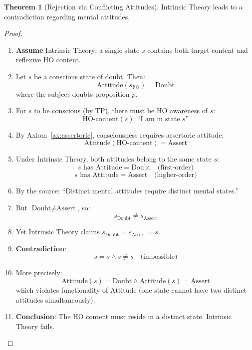 \documentclass[11pt,a4paper]{article}
\theoremstyle{definition}
\newtheorem{theorem}{Theorem}[section]
\theoremstyle{remark}
\newcommand{\Attitude}{\text{Attitude}}
\begin{document}
\begin{theorem}[Rejection via Conflicting Attitudes]
\label{thm:reject-intrinsic}
Intrinsic Theory leads to a contradiction regarding mental attitudes.
\end{theorem}

\begin{proof}
\begin{enumerate}
    \item \textbf{Assume} Intrinsic Theory: a single state $s$ contains both target content and reflexive HO content.
    \item Let $s$ be a conscious state of doubt. Then:
    \begin{equation}
    \Attitude(s_{\text{FO}}) = \text{Doubt}
    \end{equation}
    where the subject doubts proposition $p$.
    \item For $s$ to be conscious (by TP), there must be HO awareness of $s$:
    \begin{equation}
    \text{HO-content}(s) : \text{``I am in state } s\text{''}
    \end{equation}
    \item By Axiom~\ref{ax:assertoric}, consciousness requires assertoric attitude:
    \begin{equation}
    \Attitude(\text{HO-content}) = \text{Assert}
    \end{equation}
    \item Under Intrinsic Theory, both attitudes belong to the same state $s$:
    \begin{equation}
    s \text{ has } \Attitude = \text{Doubt} \quad \text{(first-order)}
    \end{equation}
    \begin{equation}
    s \text{ has } \Attitude = \text{Assert} \quad \text{(higher-order)}
    \end{equation}
    \item By the source: ``Distinct mental attitudes require distinct mental states.''
    \item But $\text{Doubt} \neq \text{Assert}$, so:
    \begin{equation}
    s_{\text{Doubt}} \neq s_{\text{Assert}}
    \end{equation}
    \item Yet Intrinsic Theory claims $s_{\text{Doubt}} = s_{\text{Assert}} = s$.
    \item \textbf{Contradiction}:
    \begin{equation}
    s = s \land s \neq s \quad \text{(impossible)}
    \end{equation}
    \item More precisely:
    \begin{equation}
    \Attitude(s) = \text{Doubt} \land \Attitude(s) = \text{Assert}
    \end{equation}
    which violates functionality of $\Attitude$ (one state cannot have two distinct attitudes simultaneously).
    \item \textbf{Conclusion}: The HO content must reside in a distinct state. Intrinsic Theory fails. \qedhere
\end{enumerate}
\end{proof}
\end{document}
